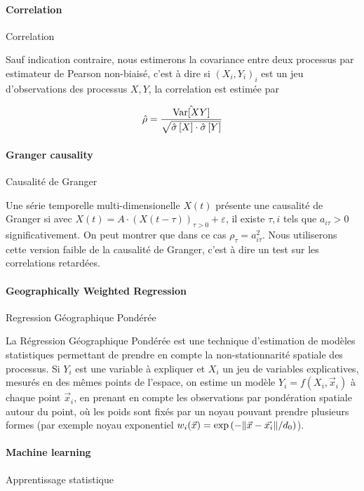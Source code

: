 \paragraph{Correlation}{Correlation}

Sauf indication contraire, nous estimerons la covariance entre deux processus par estimateur de Pearson non-biaisé, c'est à dire si $(X_i,Y_i)_i$ est un jeu d'observations des processus $X,Y$, la correlation est estimée par

\[
\hat{\rho} = \frac{\hat{\operatorname{Var}\!\left[XY\right]}}{\sqrt{\hat{\sigma} \left[X\right] \cdot \hat{\sigma}\left[Y\right]}}
\]




\paragraph{Granger causality}{Causalité de Granger}


Une série temporelle multi-dimensionelle $X(t)$ présente une causalité de Granger si avec $X(t) = A\cdot \left(X(t-\tau)\right)_{\tau >0} + \varepsilon$, il existe $\tau,i$ tels que $a_{i\tau}>0$ significativement. On peut montrer que dans ce cas $\rho_{\tau}=a_{i\tau}^2$. Nous utiliserons cette version faible de la causalité de Granger, c'est à dire un test sur les correlations retardées.




\paragraph{Geographically Weighted Regression}{Regression Géographique Pondérée}


La Régression Géographique Pondérée est une technique d'estimation de modèles statistiques permettant de prendre en compte la non-stationnarité spatiale des processus. Si $Y_i$ est une variable à expliquer et $X_i$ un jeu de variables explicatives, mesurés en des mêmes points de l'espace, on estime un modèle $Y_i = f(X_i,\vec{x}_i)$ à chaque point $\vec{x}_i$, en prenant en compte les observations par pondération spatiale autour du point, où les poids sont fixés par un noyau pouvant prendre plusieurs formes (par exemple noyau exponentiel $w_i(\vec{x}) = \exp\left(- \| \vec{x} - \vec{x_i} \| / d_0\right)$).




\paragraph{Machine learning}{Apprentissage statistique}


